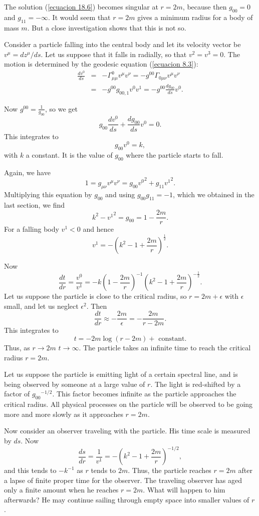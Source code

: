 The solution (\ref{ecuacion 18.6}) becomes singular at $r = 2 m$, because then $g_{00}=0$ and $g_{11}=-\infty$. It 
would seem that $r=2m$ gives a minimum radius for a body of mass $m$. But a close investigation shows that this is not 
so.

Consider a particle falling into the central body and let its velocity vector be $v^\mu = d z^\mu / ds$. Let us suppose 
that it falls in radially, so that $v^2=v^3=0$. The motion is determined by the geodesic equation (\ref{ecuacion 8.3}):
\[
 \begin{array}{rcl}
  \frac{dv^0}{ds} & = & - \Gamma^0_{\mu\mu} v^\mu v^\nu = -g^{00} \Gamma_{0\mu\nu} v^\mu v^\nu\\
         & = & -g^{00} g_{00,1} v^0 v^1 = - g^{00} \frac{dg_{00}}{ds} v^0 .
 \end{array}
\]

Now $g^{00}= \frac{1}{g_{00}}$, so we get
\[
  g_{00} \frac{dv^0}{ds} + \frac{dg_{00}}{ds} v^0 = 0.
\]
This integrates to
\[
 g_{00} v^0 = k,
\]
with $k$ a constant. It is the value of $g_{00}$ where the particle starts to fall.

Again, we have
\[
 1 = g_{\mu\nu} v^\mu v^\nu = g_{00} {v^0}^2 + g_{11} {v^1}^2 .
\]
Multiplying this equation by $g_{00}$ and using $g_{00} g_{11} = -1$, which we obtained in the last section, we find
\[
 k^2 - {v^1}^2 = g_{00} = 1 - \frac{2 m }{r}.
\]
For a falling body $v^1<0$ and hence
\[
 v^1 = - \left( k^2 - 1 + \frac{2m}{r} \right)^{\frac{1}{2}}.
\]

Now
\[
 \frac{dt}{dr} = \frac{v^0}{v^1} = - k \left( 1 - \frac{2 m}{r} \right)^{-1}
 \left( k^2 - 1 + \frac{2m}{r} \right)^{-\frac{1}{2}}.
\]
Let us suppose the particle is close to the critical radius, so $r = 2 m + \epsilon$ with $\epsilon$ small, and let us 
neglect $\epsilon^2$. Then 
\[
 \frac{dt}{dr} \approx - \frac{2 m }{\epsilon} = - \frac{2 m}{r - 2m}.
\]
This integrates to
\[
 t = - 2 m \log (r - 2 m) + \mbox{ constant}.
\]
Thus, as $r\rightarrow 2m$ $t\rightarrow \infty$. The particle takes an infinite time to reach the critical radius $r = 
2 m$.

Let us suppose the particle is emitting light of a certain spectral line, and is being observed by someone at a large 
value of $r$. The light is red-shifted by a factor of ${g_{00}}^{-1/2}$. This factor becomes infinite as the particle 
approaches the critical radius. All physical processes on the particle will be observed to be going more and more 
slowly as it approaches $r=2m$.

Now consider an observer traveling with the particle. His time scale is measured by $ds$. Now 
\[
 \frac{ds}{dr} = \frac{1}{v^1} = - \left( k^2 - 1 + \frac{2 m }{r} \right) ^{-1/2},
\]
and this tends to $-k^{-1}$ as $r$ tends to $2m$. Thus, the particle reaches $r = 2m$ after a lapse of finite proper 
time for the observer. The traveling observer has aged only a finite amount when he reaches $r = 2m$. What will happen 
to him afterwards? He may continue sailing through empty space into smaller values of $r$.

